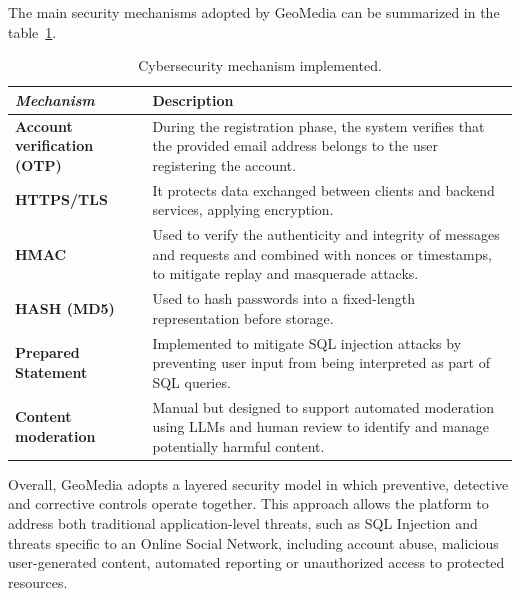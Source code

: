 The main security mechanisms adopted by GeoMedia can be summarized in the table~\ref{tab:cybersec_recap}.
\begin{table}[H]
\centering
\renewcommand{\arraystretch}{1.4}
\setlength{\arrayrulewidth}{0.6pt}

\begin{tabular}{|
>{\columncolor[HTML]{ECF4FF}}l|
>{\columncolor[HTML]{ECF4FF}\raggedright\arraybackslash}p{8cm}|
}
\hline
\cellcolor[HTML]{a8bca7}\textit{\textbf{Mechanism}}
& \cellcolor[HTML]{a8bca7}\textbf{Description}
\\ \hline

\textbf{Account verification (OTP)}
& During the registration phase, the system verifies that the provided email address belongs to the user registering the account.
\\ \hline

\textbf{HTTPS/TLS}
& It protects data exchanged between clients and backend services, applying encryption.
\\ \hline

\textbf{HMAC}
& Used to verify the authenticity and integrity of messages and requests and combined with nonces or timestamps, to mitigate replay and masquerade attacks.
\\ \hline

\textbf{HASH (MD5)}
& Used to hash passwords into a fixed-length representation before storage.
\\ \hline
\textbf{Prepared Statement}
& Implemented to mitigate SQL injection attacks by preventing user input from being interpreted as part of SQL queries.
\\ \hline
\textbf{Content moderation}
& Manual but designed to support automated moderation using LLMs and human review to identify and manage potentially harmful content.
\\ \hline

\end{tabular}
\caption{Cybersecurity mechanism implemented.}
\label{tab:cybersec_recap}
\end{table}

Overall, GeoMedia adopts a layered security model in which preventive, detective and corrective controls operate together. This approach allows the platform to address both traditional application-level threats, such as SQL Injection and threats specific to an Online Social Network, including account abuse, malicious user-generated content, automated reporting or unauthorized access to protected resources.
